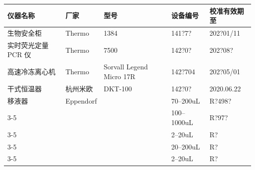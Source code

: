 \documentclass[UTF8,10pt,a4paper,fontset=fandol]{ctexart}
\newcommand{\fieldvalue}[1]{#1}
\newcommand{\handwritten}[1]{#1}
\begin{document}
\begin{center}
\begin{tabular}{|p{3.2cm}|p{3.0cm}|p{3.0cm}|p{3.2cm}|p{4.0cm}|}
\hline
仪器名称 & 厂家 & 型号 & 设备编号 & 校准有效期至\\
\hline
生物安全柜 & Thermo & 1384 &
\fieldvalue{\handwritten{141?7?}}
&
\fieldvalue{\handwritten{202?01/11}}
\\
\hline
实时荧光定量 PCR 仪 & Thermo & 7500 &
\fieldvalue{\handwritten{142?0?}}
&
\fieldvalue{\handwritten{202?08?}}
\\
\hline
高速冷冻离心机 & Thermo & Sorvall Legend Micro 17R &
\fieldvalue{\handwritten{142?704}}
&
\fieldvalue{\handwritten{202?05/01}}
\\
\hline
干式恒温器 & 杭州米欧 & DKT-100 &
\fieldvalue{\handwritten{142?0?}}
&
\fieldvalue{\handwritten{2020.06.22}}
\\
\hline
移液器 & Eppendorf & &
\fieldvalue{\handwritten{70--200uL}}
&
\fieldvalue{\handwritten{R?498?}}
\\[-1mm]
\cline{3-5}
& & &
\fieldvalue{\handwritten{100--1000uL}}
&
\fieldvalue{\handwritten{R?97?}}
\\[-1mm]
\cline{3-5}
& & &
\fieldvalue{\handwritten{2--20uL}}
&
\fieldvalue{\handwritten{R?}}
\\[-1mm]
\cline{3-5}
& & &
\fieldvalue{\handwritten{20--200uL}}
&
\fieldvalue{\handwritten{R?}}
\\[-1mm]
\cline{3-5}
& & &
\fieldvalue{\handwritten{2--20uL}}
&
\fieldvalue{\handwritten{R?}}
\\
\hline
\end{tabular}
\end{center}
\end{document}
